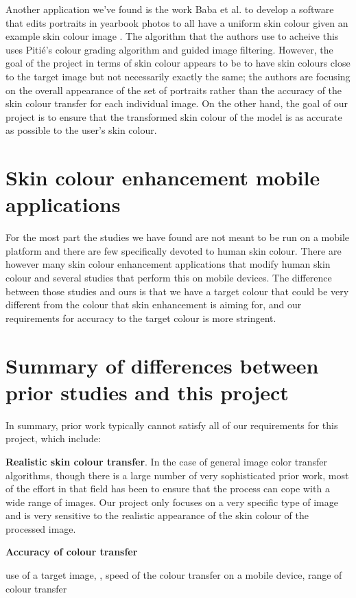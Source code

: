 Another application we've found is the work Baba et al. to develop a software that edits portraits in yearbook photos to all have a uniform skin colour given an example skin colour image \cite{baba_2015_yearbook}. The algorithm that the authors use to acheive this uses Pitié's colour grading algorithm and guided image filtering. However, the goal of the project in terms of skin colour appears to be to have skin colours close to the target image but not necessarily exactly the same; the authors are focusing on the overall appearance of the set of portraits rather than the accuracy of the skin colour transfer for each individual image. On the other hand, the goal of our project is to ensure that the transformed skin colour of the model is as accurate as possible to the user's skin colour.

\section{Skin colour enhancement mobile applications}
For the most part the studies we have found are not meant to be run on a mobile platform and there are few specifically devoted to human skin colour. There are however many skin colour enhancement applications that modify human skin colour and several studies that perform this on mobile devices. 
The difference between those studies and ours is that we have a target colour that could be very different from the colour that skin enhancement is aiming for, and our requirements for accuracy to the target colour is more stringent.

\section{Summary of differences between prior studies and this project}
In summary, prior work typically cannot satisfy all of our requirements for this project, which include:

\textbf{Realistic skin colour transfer}. In the case of general image color transfer algorithms, though there is a large number of very sophisticated prior work, most of the effort in that field has been to ensure that the process can cope with a wide range of images. Our project only focuses on a very specific type of image and is very sensitive to the realistic appearance of the skin colour of the processed image.

\textbf{Accuracy of colour transfer}


 use of a target image, , speed of the colour transfer on a mobile device, range of colour transfer


